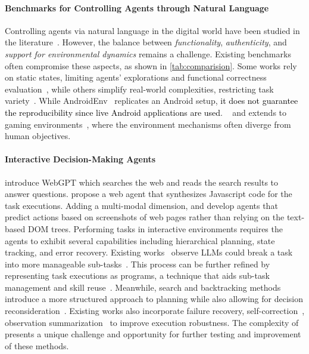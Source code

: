 \documentclass{article}
\newcommand{\rebuttal}[1]{\textcolor{black}{#1}}%
\begin{document}
\paragraph{Benchmarks for Controlling Agents through Natural Language} 
Controlling agents via natural language in the digital world have been studied in the literature~\citep{branavan2009reinforcement,shi2017world,liu2018reinforcement, toyama2021androidenv,deng2023mind2web,li2020mapping,xu2021grounding}. 
However, the balance between \emph{functionality}, \emph{authenticity}, and \emph{support for environmental dynamics} remains a challenge. 
Existing benchmarks often compromise these aspects, as shown in \autoref{tab:comparision}. 
Some works rely on static states, limiting agents' explorations and functional correctness evaluation~\citep{shi2017world,deng2023mind2web}, while others simplify real-world complexities, restricting task variety~\citep{yao2022webshop,liu2018reinforcement}.
While AndroidEnv~\citep{toyama2021androidenv} replicates an Android setup, \rebuttal{it does not guarantee the reproducibility since live Android applications are used}. ~\citep{ai2thor, shridhar_alfred:_2019, puig_virtualhome:_2018} and extends to gaming environments~\citep{fan2022minedojo, kuttler_nethack_2020}, where the environment mechanisms often diverge from human objectives.


\paragraph{Interactive Decision-Making Agents} 
\cite{nakano2021webgpt} introduce WebGPT which searches the web and reads the search results to answer questions. \cite{gur2023real} propose a web agent that synthesizes Javascript code for the task executions. Adding a multi-modal dimension, \cite{lee2023pix2struct} and \cite{shaw2023pixels} develop agents that predict actions based on screenshots of web pages rather than relying on the text-based DOM trees.
Performing tasks in interactive environments requires the agents to exhibit several capabilities including hierarchical planning, state tracking, and error recovery.
Existing works~\citep{huang2022language,madaan2022language,li2023take} observe LLMs could break a task into more manageable sub-tasks~\citep{zhou2022show}.
This process can be further refined by representing task executions as programs, a technique that aids sub-task management and skill reuse~\citep{zhou2021hierarchical,liang2023code,wang2023voyager,gao2023pal}. Meanwhile, search and backtracking methods introduce a more structured approach to planning while also allowing for decision reconsideration~\citep{yao2023tree,long2023large}. 
Existing works also incorporate failure recovery, self-correction~\citep{shinn2023reflexion,kim2023language}, observation summarization~\citep{sridhar2023hierarchical} to improve execution robustness.
The complexity of \ours presents a unique challenge and opportunity for further testing and improvement of these methods.
\end{document}
